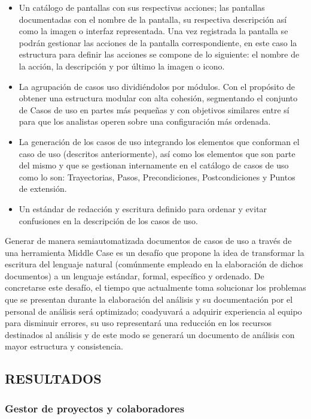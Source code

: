 \documentclass{article}
\begin{document}
\begin{multicols}{2}
\begin{itemize}
		\item Un catálogo de pantallas con sus respectivas acciones; las pantallas documentadas con el nombre de la pantalla, su respectiva descripción así como la imagen o interfaz representada. Una vez registrada la pantalla se podrán gestionar las acciones de la pantalla correspondiente, en este caso la estructura para definir las acciones se compone de lo siguiente: el nombre de la acción, la descripción y por último la imagen o icono.
		\item La agrupación de casos uso dividiéndolos por módulos. Con el propósito de obtener una estructura modular con alta cohesión, segmentando el conjunto de Casos de uso en partes más pequeñas y con objetivos similares entre sí para que los analistas operen sobre una configuración más ordenada.
		\item La generación de los casos de uso integrando los elementos que conforman el caso de uso (descritos anteriormente), así como los elementos que son parte del mismo y que se gestionan internamente en el catálogo de casos de uso como lo son: Trayectorias, Pasos, Precondiciones, Postcondiciones y Puntos de extensión.
		\item Un estándar de redacción y escritura definido para ordenar y evitar confusiones en la descripción de los casos de uso.
	\end{itemize}
	
	Generar de manera semiautomatizada documentos de casos de uso a través de una herramienta Middle Case es un desafío que propone la idea de transformar la escritura del lenguaje natural (comúnmente empleado en la elaboración de dichos documentos) a un lenguaje estándar, formal, específico y ordenado. De concretarse este desafío, el tiempo que actualmente toma solucionar los problemas que se presentan durante la elaboración del análisis y su documentación por el personal de análisis será optimizado; coadyuvará a adquirir experiencia al equipo para disminuir errores, su uso representará una reducción en los recursos destinados al análisis y de este modo se generará un documento de análisis con mayor estructura y consistencia.
	
	\subsection{RESULTADOS}
	
	\subsubsection{Gestor de proyectos y colaboradores}
	

\end{multicols}
\end{document}
